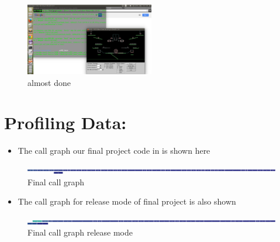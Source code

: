 \documentclass[10pt,a4paper]{article}
\begin{document}
 \begin{figure}[!htb]
 \begin{centering}
 \includegraphics[width=0.5\textwidth]{prefinal.png}
 \end{centering}
 \caption{almost done}
 \end{figure}
 \vspace{-10pt}
 
 \section*{\textbf{Profiling Data:}}
   \begin{itemize}
   \item The call graph our final project code in is shown here
    \end{itemize}  
 \begin{figure}[!htb]
 \begin{centering}
 \includegraphics[width=5.0\textwidth]{final.png}
 \end{centering}
 \caption{Final call graph}
 \end{figure}
 \vspace{-10pt}
      
   \begin{itemize}
    \item The call graph for release mode of final project is also shown
   \end{itemize}

 \begin{figure}[!htb]
 \begin{centering}
 \includegraphics[width=5.0\textwidth]{final_release.png}
 \end{centering}
 \caption{Final call graph release mode}
 \end{figure}
 \vspace{-10pt}  
\end{document}
